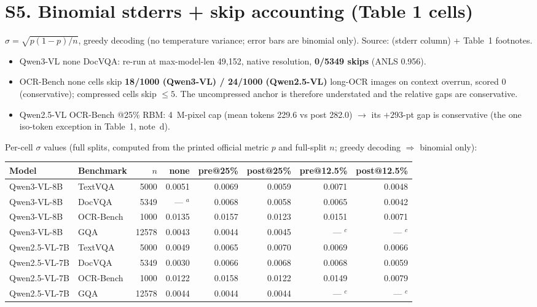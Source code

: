\documentclass[sigconf,review,anonymous]{acmart}
\begin{document}
\section*{S5. Binomial stderrs + skip accounting (Table 1 cells)}

$\sigma = \sqrt{p(1 - p)/n}$, greedy decoding (no temperature variance; error
bars are binomial only). Source:  (stderr
column) + Table~1 footnotes.

\begin{itemize}
  \item Qwen3-VL none DocVQA: re-run at max-model-len 49,152, native
    resolution, \textbf{0/5349 skips} (ANLS 0.956).
  \item OCR-Bench none cells skip \textbf{18/1000 (Qwen3-VL) / 24/1000
    (Qwen2.5-VL)} long-OCR images on context overrun, scored 0 (conservative);
    compressed cells skip $\leq 5$. The uncompressed anchor is therefore
    understated and the relative gaps are conservative.
  \item Qwen2.5-VL OCR-Bench @25\% RBM: 4~M-pixel cap (mean tokens 229.6 vs
    post 282.0) $\to$ its $+293$-pt gap is conservative (the one iso-token
    exception in Table~1, note~d).
\end{itemize}

\noindent Per-cell $\sigma$ values (full splits, computed from the printed
official metric $p$ and full-split $n$; greedy decoding $\Rightarrow$ binomial
only):

\begin{table}[h]
  \centering
  \small
  \begin{tabular}{@{}l l r r r r r r@{}}
    \toprule
    Model & Benchmark & $n$ & none & pre@25\% & post@25\% & pre@12.5\% & post@12.5\% \\
    \midrule
    Qwen3-VL-8B   & TextVQA   & 5000  & 0.0051   & 0.0069 & 0.0059 & 0.0071 & 0.0048 \\
    Qwen3-VL-8B   & DocVQA    & 5349  & --- $^{a}$ & 0.0068 & 0.0058 & 0.0065 & 0.0042 \\
    Qwen3-VL-8B   & OCR-Bench & 1000  & 0.0135   & 0.0157 & 0.0123 & 0.0151 & 0.0071 \\
    Qwen3-VL-8B   & GQA       & 12578 & 0.0043   & 0.0044 & 0.0045 & --- $^{c}$ & --- $^{c}$ \\
    \midrule
    Qwen2.5-VL-7B & TextVQA   & 5000  & 0.0049   & 0.0065 & 0.0070 & 0.0069 & 0.0066 \\
    Qwen2.5-VL-7B & DocVQA    & 5349  & 0.0030   & 0.0066 & 0.0068 & 0.0068 & 0.0059 \\
    Qwen2.5-VL-7B & OCR-Bench & 1000  & 0.0122   & 0.0158 & 0.0122 & 0.0149 & 0.0079 \\
    Qwen2.5-VL-7B & GQA       & 12578 & 0.0044   & 0.0044 & 0.0044 & --- $^{c}$ & --- $^{c}$ \\
    \bottomrule
  \end{tabular}
\end{table}
\end{document}
